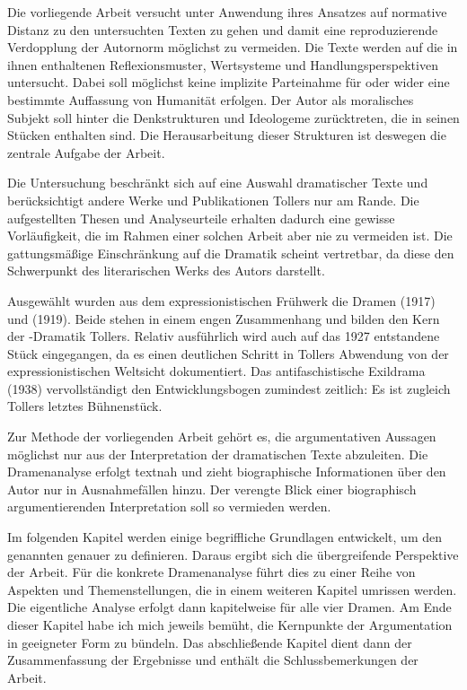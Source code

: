 Die vorliegende Arbeit versucht unter Anwendung ihres
 Ansatzes auf normative Distanz zu den
untersuchten Texten zu gehen und damit eine reproduzierende Verdopplung der
Autornorm möglichst zu vermeiden. Die Texte werden auf die in ihnen
enthaltenen Reflexionsmuster, Wertsysteme und Handlungsperspektiven
untersucht. Dabei soll möglichst keine implizite Parteinahme für oder wider
eine bestimmte Auffassung von Humanität erfolgen. Der Autor als moralisches
Subjekt soll hinter die Denkstrukturen und Ideologeme zurücktreten, die in
seinen Stücken enthalten sind. Die Herausarbeitung dieser Strukturen ist
deswegen die zentrale Aufgabe der Arbeit.

Die Untersuchung beschränkt sich auf eine Auswahl
dramatischer Texte und berücksichtigt andere Werke und Publikationen Tollers
nur am Rande. Die aufgestellten Thesen und Analyseurteile erhalten dadurch
eine gewisse Vorläufigkeit, die im Rahmen einer solchen Arbeit aber nie zu
vermeiden ist. Die gattungsmäßige Einschränkung auf die Dramatik scheint
vertretbar, da diese den Schwerpunkt des literarischen Werks des Autors
darstellt. 

Ausgewählt wurden aus dem expressionistischen Frühwerk die
 Dramen  (1917) und  (1919). Beide stehen in einem engen Zusammenhang und bilden den Kern
der -Dramatik Tollers. Relativ ausführlich wird auch auf das 1927
entstandene
Stück  eingegangen, da es einen deutlichen Schritt in
Tollers Abwendung von der expressionistischen Weltsicht dokumentiert. Das
antifaschistische Exildrama  (1938) vervollständigt den
Entwicklungsbogen zumindest zeitlich: Es ist zugleich Tollers letztes
Bühnenstück.

Zur Methode der vorliegenden Arbeit gehört es, die argumentativen Aussagen
möglichst nur aus der Interpretation der dramatischen Texte abzuleiten. 
Die Dramenanalyse erfolgt textnah und zieht biographische
Informationen über den Autor nur in Ausnahmefällen hinzu. Der verengte
Blick einer biographisch argumentierenden Interpretation soll so
vermieden werden. 

Im folgenden Kapitel werden einige begriffliche Grundlagen entwickelt, um den
genannten  genauer zu definieren. Daraus
ergibt sich die übergreifende Perspektive der Arbeit. Für die konkrete
Dramenanalyse führt dies zu einer Reihe von Aspekten und Themenstellungen, die
in einem weiteren Kapitel umrissen werden. Die
eigentliche Analyse erfolgt dann kapitelweise für alle vier Dramen. Am Ende
dieser Kapitel habe ich mich jeweils bemüht, die Kernpunkte der
Argumentation in geeigneter Form zu bündeln. Das abschließende Kapitel dient
dann der Zusammenfassung der Ergebnisse und enthält die Schlussbemerkungen der Arbeit.

